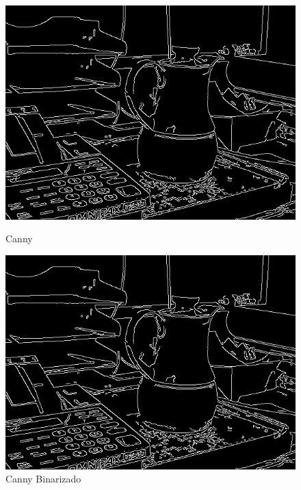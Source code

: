 \documentclass[10pt,twocolumn,letterpaper]{article}
\begin{document}
\begin{figure}[!htb]
  \includegraphics[width=\linewidth]{46-cannyn.jpg}
  \caption{Canny}\label{fig:cannyn}
\endminipage\hfill
{}
  \includegraphics[width=\linewidth]{46-cannyb.jpg}
  \caption{Canny Binarizado}\label{fig:cannyb}
\endminipage
\end{figure}
\end{document}
